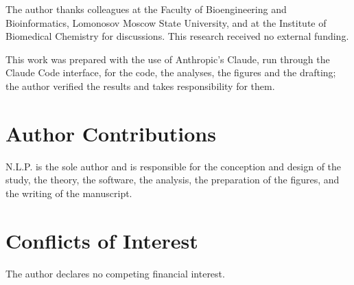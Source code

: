 \documentclass[journal=jctcce,manuscript=article]{achemso}
\theoremstyle{plain}
\theoremstyle{remark}
\begin{document}
\begin{acknowledgement}
The author thanks colleagues at the Faculty of Bioengineering and Bioinformatics,
Lomonosov Moscow State University, and at the Institute of Biomedical Chemistry for discussions.
This research received no external funding.

This work was prepared with the use of Anthropic's Claude, run through the Claude Code interface,
for the code, the analyses, the figures and the drafting; the author verified the results and
takes responsibility for them.
\end{acknowledgement}

\section*{Author Contributions}
N.L.P. is the sole author and is responsible for the conception and design of the study, the
theory, the software, the analysis, the preparation of the figures, and the writing of the
manuscript.

\section*{Conflicts of Interest}
The author declares no competing financial interest.
\end{document}
